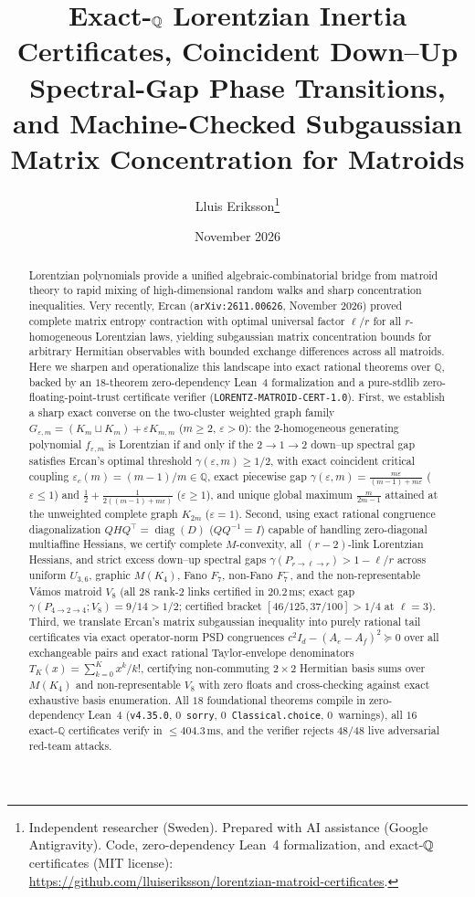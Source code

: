 \documentclass[11pt,a4paper]{article}
\title{\bfseries Exact-$\QQ$ Lorentzian Inertia Certificates, Coincident Down--Up Spectral-Gap Phase Transitions, and Machine-Checked Subgaussian Matrix Concentration for Matroids}
\author{Lluis Eriksson\thanks{Independent researcher (Sweden). Prepared with AI assistance (Google Antigravity). Code, zero-dependency Lean~4 formalization, and exact-$\QQ$ certificates (MIT license):\\ \url{https://github.com/lluiseriksson/lorentzian-matroid-certificates}.}}
\date{November 2026}
\theoremstyle{definition}
\theoremstyle{remark}
\newcommand{\QQ}{\mathbb{Q}}
\newcommand{\diag}{\operatorname{diag}}
\newcommand{\certschema}{\texttt{LORENTZ-MATROID-CERT-1.0}}
\begin{document}
\maketitle

\begin{abstract}
Lorentzian polynomials provide a unified algebraic-combinatorial bridge from matroid theory to rapid mixing of high-dimensional random walks and sharp concentration inequalities. Very recently, Ercan (\texttt{arXiv:2611.00626}, November 2026) proved complete matrix entropy contraction with optimal universal factor $\ell/r$ for all $r$-homogeneous Lorentzian laws, yielding subgaussian matrix concentration bounds for arbitrary Hermitian observables with bounded exchange differences across all matroids. Here we sharpen and operationalize this landscape into exact rational theorems over $\QQ$, backed by an $18$-theorem zero-dependency Lean~4 formalization and a pure-stdlib zero-floating-point-trust certificate verifier (\certschema{}). First, we establish a sharp exact converse on the two-cluster weighted graph family $G_{\varepsilon,m} = (K_m \sqcup K_m) + \varepsilon K_{m,m}$ ($m \ge 2$, $\varepsilon > 0$): the $2$-homogeneous generating polynomial $f_{\varepsilon,m}$ is Lorentzian if and only if the $2 \to 1 \to 2$ down--up spectral gap satisfies Ercan's optimal threshold $\gamma(\varepsilon,m) \ge 1/2$, with exact coincident critical coupling $\varepsilon_c(m) = (m-1)/m \in \QQ$, exact piecewise gap $\gamma(\varepsilon,m) = \frac{m\varepsilon}{(m-1)+m\varepsilon}$ ($\varepsilon \le 1$) and $\frac{1}{2} + \frac{1}{2((m-1)+m\varepsilon)}$ ($\varepsilon \ge 1$), and unique global maximum $\frac{m}{2m-1}$ attained at the unweighted complete graph $K_{2m}$ ($\varepsilon=1$). Second, using exact rational congruence diagonalization $Q H Q^\top = \diag(D)$ ($Q Q^{-1} = I$) capable of handling zero-diagonal multiaffine Hessians, we certify complete $M$-convexity, all $(r-2)$-link Lorentzian Hessians, and strict excess down--up spectral gaps $\gamma(P_{r\to\ell\to r}) > 1-\ell/r$ across uniform $U_{3,6}$, graphic $M(K_4)$, Fano $F_7$, non-Fano $F_7^-$, and the non-representable V\'amos matroid $V_8$ (all $28$ rank-$2$ links certified in $20.2\,\mathrm{ms}$; exact gap $\gamma(P_{4\to 2\to 4}; V_8) = 9/14 > 1/2$; certified bracket $[46/125, 37/100] > 1/4$ at $\ell=3$). Third, we translate Ercan's matrix subgaussian inequality into purely rational tail certificates via exact operator-norm PSD congruences $c^2 I_d - (A_e - A_f)^2 \succeq 0$ over all exchangeable pairs and exact rational Taylor-envelope denominators $T_K(x) = \sum_{k=0}^K x^k/k!$, certifying non-commuting $2\times 2$ Hermitian basis sums over $M(K_4)$ and non-representable $V_8$ with zero floats and cross-checking against exact exhaustive basis enumeration. All $18$ foundational theorems compile in zero-dependency Lean~4 (\texttt{v4.35.0}, $0$~\texttt{sorry}, $0$~\texttt{Classical.choice}, $0$~warnings), all $16$ exact-$\QQ$ certificates verify in $\le 404.3\,\mathrm{ms}$, and the verifier rejects $48/48$ live adversarial red-team attacks.
\end{abstract}
\end{document}
